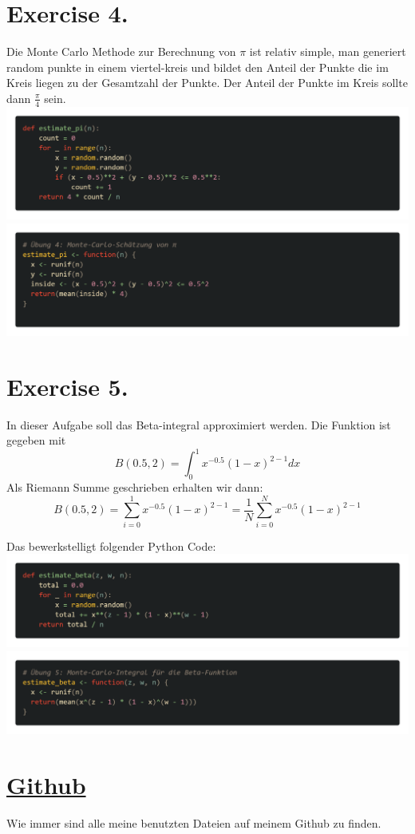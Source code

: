 \documentclass{scrartcl}
\begin{document}
\section*{Exercise 4.}
Die Monte Carlo Methode zur Berechnung von $\pi$ ist relativ simple, man generiert random punkte in einem viertel-kreis und bildet den Anteil der Punkte die im Kreis liegen zu der Gesamtzahl der Punkte. Der Anteil der Punkte im Kreis sollte dann $\frac{\pi}{4}$ sein.\\
\includegraphics*[scale=0.24]{Monte_Carlo_pi_py.png}\\
\includegraphics*[scale=0.24]{Monte_Carlo_pi_R.png}
\section*{Exercise 5.}
In dieser Aufgabe soll das Beta-integral approximiert werden. Die Funktion ist gegeben mit
$$B(0.5,2) = \int_{0}^{1} x^{-0.5}(1-x)^{2-1}dx$$
Als Riemann Summe geschrieben erhalten wir dann:
$$B(0.5,2)= \sum_{i=0}^{1} x^{-0.5}(1-x)^{2-1} = \frac1N \sum_{i=0}^{N} x^{-0.5}(1-x)^{2-1} $$

Das bewerkstelligt folgender Python Code:\\
\includegraphics*[scale=0.24]{estimate_beta_py.png}\\
\includegraphics*[scale=0.24]{estimate_beta_R.png}


\section*{\href{https://github.com/7hands/Angewandte-Modellierung-25-Colmant}{Github}}
Wie immer sind alle meine benutzten Dateien auf meinem Github zu finden. 
\end{document}
